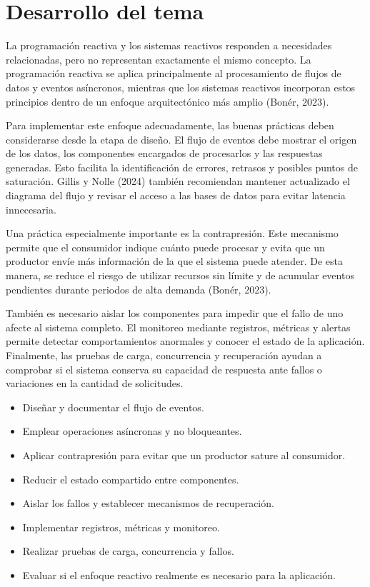 \documentclass[12pt]{article}
\begin{document}
	
	\section*{Desarrollo del tema}
	
	La programación reactiva y los sistemas reactivos responden a necesidades
	relacionadas, pero no representan exactamente el mismo concepto. La
	programación reactiva se aplica principalmente al procesamiento de flujos de
	datos y eventos asíncronos, mientras que los sistemas reactivos incorporan
	estos principios dentro de un enfoque arquitectónico más amplio (Bonér, 2023).
	
	Para implementar este enfoque adecuadamente, las buenas prácticas deben
	considerarse desde la etapa de diseño. El flujo de eventos debe mostrar el
	origen de los datos, los componentes encargados de procesarlos y las respuestas
	generadas. Esto facilita la identificación de errores, retrasos y posibles
	puntos de saturación. Gillis y Nolle (2024) también recomiendan mantener
	actualizado el diagrama del flujo y revisar el acceso a las bases de datos para
	evitar latencia innecesaria.
	
	Una práctica especialmente importante es la contrapresión. Este mecanismo
	permite que el consumidor indique cuánto puede procesar y evita que un
	productor envíe más información de la que el sistema puede atender. De esta
	manera, se reduce el riesgo de utilizar recursos sin límite y de acumular
	eventos pendientes durante periodos de alta demanda (Bonér, 2023).
	
	También es necesario aislar los componentes para impedir que el fallo de uno
	afecte al sistema completo. El monitoreo mediante registros, métricas y
	alertas permite detectar comportamientos anormales y conocer el estado de la
	aplicación. Finalmente, las pruebas de carga, concurrencia y recuperación
	ayudan a comprobar si el sistema conserva su capacidad de respuesta ante
	fallos o variaciones en la cantidad de solicitudes.
	
	\begin{itemize}
	
	\item Diseñar y documentar el flujo de eventos.
	\item Emplear operaciones asíncronas y no bloqueantes.
	\item Aplicar contrapresión para evitar que un productor sature al consumidor.
	\item Reducir el estado compartido entre componentes.
	\item Aislar los fallos y establecer mecanismos de recuperación.
	\item Implementar registros, métricas y monitoreo.
	\item Realizar pruebas de carga, concurrencia y fallos.
	\item Evaluar si el enfoque reactivo realmente es necesario para la aplicación.
	
	\end{itemize}
	
\end{document}
